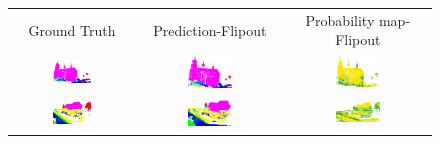     \begin{figure}[h!]
        \centering
        \begin{tabular}{ccc}
            Ground Truth & Prediction-Flipout & Probability map-Flipout \\
            \includegraphics[width=0.33\textwidth, height=0.18\textheight]{images/seg_output/sem3d_seg_output/1_GT.pdf} &
            \includegraphics[width=0.33\textwidth, height=0.18\textheight]{images/seg_output/flipout/sem3d_1.pdf}& 
            \includegraphics[width=0.33\textwidth, height=0.18\textheight]{images/seg_output/flipout/1_fout_prob.pdf}\\

            \includegraphics[width=0.33\textwidth, height=0.18\textheight]{images/seg_output/sem3d_seg_output/2_GT.pdf} &
            \includegraphics[width=0.33\textwidth, height=0.18\textheight]{images/seg_output/flipout/sem3d_2.pdf}& 
            \includegraphics[width=0.33\textwidth, height=0.18\textheight]{images/seg_output/flipout/2_fout_prob.pdf}\\


\end{tabular}
\end{figure}

